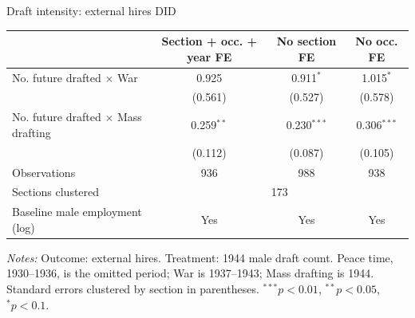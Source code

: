 \begin{frame}[t]{Draft intensity: external hires DID}
    \scriptsize
    \centering
    \begin{threeparttable}
    \begin{tabular}{lccc}
        \toprule
        & Section + occ. + year FE & No section FE & No occ. FE \\
        \midrule
        No. future drafted $\times$ War & 0.925 & 0.911$^{*}$ & 1.015$^{*}$ \\
        & (0.561) & (0.527) & (0.578) \\
        No. future drafted $\times$ Mass drafting & 0.259$^{**}$ & 0.230$^{***}$ & 0.306$^{***}$ \\
        & (0.112) & (0.087) & (0.105) \\
        \midrule
        Observations & 936 & 988 & 938 \\
        Sections clustered & \multicolumn{3}{c}{173} \\
        Baseline male employment (log) & Yes & Yes & Yes \\
        \bottomrule
    \end{tabular}
    \begin{tablenotes}[flushleft]
        \tiny
        \item \textit{Notes:} Outcome: external hires. Treatment: 1944 male draft count. Peace time, 1930--1936, is the omitted period; War is 1937--1943; Mass drafting is 1944. Standard errors clustered by section in parentheses. $^{***}p<0.01$, $^{**}p<0.05$, $^{*}p<0.1$.
    \end{tablenotes}
    \end{threeparttable}
\end{frame}

